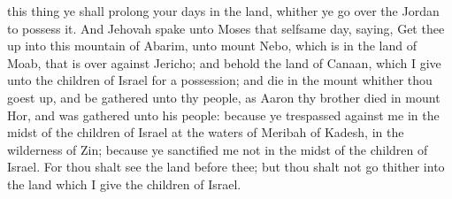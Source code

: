 this thing ye shall prolong your days in the land, whither ye go over the Jordan to possess it.  And Jehovah spake unto Moses that selfsame day, saying, Get thee up into this mountain of Abarim, unto mount Nebo, which is in the land of Moab, that is over against Jericho; and behold the land of Canaan, which I give unto the children of Israel for a possession; and die in the mount whither thou goest up, and be gathered unto thy people, as Aaron thy brother died in mount Hor, and was gathered unto his people: because ye trespassed against me in the midst of the children of Israel at the waters of Meribah of Kadesh, in the wilderness of Zin; because ye sanctified me not in the midst of the children of Israel. For thou shalt see the land before thee; but thou shalt not go thither into the land which I give the children of Israel. 

